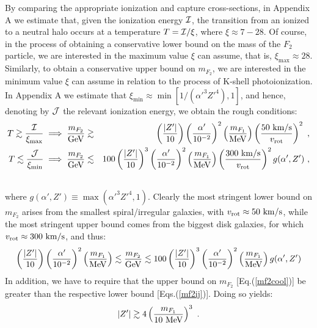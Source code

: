 \documentclass[12pt]{article}
\begin{document}
{{By comparing the appropriate ionization and capture cross-sections, in
Appendix A we estimate that, given the ionization energy ${\cal I}$, the
transition from an ionized to a neutral halo occurs at a temperature $T
= {\cal I}/\xi$, where $\xi \approx 7-28$. Of course, in the process of
obtaining a conservative lower bound on the mass of the $F_2$ particle,
we are interested in the maximum value $\xi$ can assume, that is, $\xi
_{\max} \approx 28$. Similarly, to obtain a conservative upper bound on
$m _{F_2}$, we are interested in the minimum value $\xi$ can assume in
relation to the process of K-shell photoionization. In Appendix A we
estimate that $\xi _{\min} \approx \min [1/({\alpha '} ^3{Z'} ^4),1]$,
and hence, denoting by ${\cal J}$ the relevant ionization energy, we
obtain the rough conditions:
%
\begin{eqnarray}
T \gtrsim \frac{{\cal I}}{\xi _{\max}} \implies \frac{m _{F_2}}{\rm GeV}
& \gtrsim & \left (\frac{|Z'|}{10} \right )\left (\frac{\alpha '}{10
^{-2}} \right ) ^2\left ( \frac{m _{F_1}}{\rm MeV} \right )\left (
\frac{50 \ {\rm km/s}}{v _{\text{rot}}} \right ) ^2 \ , \nonumber \\
T \lesssim \frac{{\cal J}}{\xi _{\min}} \implies \frac{m _{F_2}}{\rm
GeV} & \lesssim & 100 \left ( \frac{|Z'|}{10} \right ) ^3\left
(\frac{\alpha '}{10 ^{-2}} \right ) ^2\left ( \frac{m _{F_1}}{\rm MeV}
\right )\left ( \frac{300 \ {\rm km/s}}{v _{\text{rot}}} \right )
^2g(\alpha ',Z') \ ,
\nonumber \\
~  
\label{mf2ij}
\end{eqnarray}
%
where $g(\alpha ',Z') \equiv \max({\alpha '} ^3{Z'} ^4,1)$. Clearly the
most stringent lower bound on $m _{F_2}$ arises from the smallest
spiral/irregular galaxies, with $v _{\text{rot}} \approx 50 \ \rm km/s$,
while the most stringent upper bound comes from the biggest disk
galaxies, for which $v _{\text{rot}} \approx 300 \ \rm km/s$, and thus:
%
\begin{eqnarray}
\left (\frac{|Z'|}{10} \right )\left (\frac{\alpha '}{10 ^{-2}} \right )
^2\left ( \frac{m _{F_1}}{\rm MeV} \right ) \lesssim \frac{m
_{F_2}}{{\rm GeV}} \lesssim 100 \left ( \frac{|Z'|}{10} \right ) ^3\left
(\frac{\alpha '}{10 ^{-2}} \right ) ^2\left ( \frac{m _{F_1}}{\rm MeV}
\right )g(\alpha ',Z')
\label{mf2bounds}
\end{eqnarray}
%
In addition, we have to require that the upper bound on $m _{F_2}$
[Eq.(\ref{mf2cool})] be greater than the respective lower bound
[Eqs.(\ref{mf2ij})]. Doing so yields:
%
\begin{eqnarray}
|Z'| \gtrsim 4 \left ( \frac{m _{F_1}}{10 \ \rm MeV} \right ) ^3 \ .
\label{boundz}
\end{eqnarray}
%

}}
\end{document}
